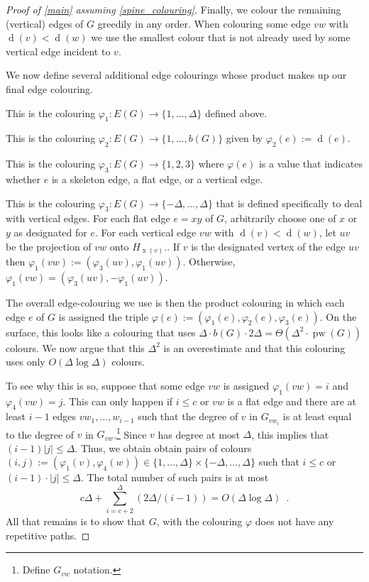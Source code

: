 \documentclass[kpfonts]{patmorin}
\DeclareMathOperator{\pw}{pw}
\DeclareMathOperator{\x}{x}
\DeclareMathOperator{\depth}{d}
\begin{document}
\begin{proof}[Proof of \cref{main} assuming \cref{spine_colouring}]
    Finally, we colour the remaining (vertical) edges of $G$ greedily in any order.  When colouring some edge $vw$ with $\depth(v)<\depth(w)$ we use the smallest colour that is not already used by some vertical edge incident to $v$.

    We now define several additional edge colourings whose product makes up our final edge colouring.
    \begin{compactenum}[$\varphi_1$:]
        \item This is the colouring $\varphi_1:E(G)\to\{1,\ldots,\Delta\}$ defined above.
        \item This is the colouring $\varphi_2:E(G)\to\{1,\ldots,b(G)\}$ given by $\varphi_2(e):=\depth(e)$.
        \item This is the colouring $\varphi_3:E(G)\to\{1,2,3\}$ where $\varphi(e)$ is a value that indicates whether $e$ is a skeleton edge, a flat edge, or a vertical edge.
        \item This is the colouring $\varphi_3:E(G)\to\{-\Delta,\ldots,\Delta\}$ that is defined specifically to deal with vertical edges.  For each flat edge $e=xy$ of $G$, arbitrarily choose one of $x$ or $y$ as designated for $e$.  For each vertical edge $vw$ with $\depth(v)<\depth(w)$, let $uv$ be the projection of $vw$ onto $H_{\x(v)}$..  If $v$ is the designated vertex of the edge $uv$ then $\varphi_1(vw):=(\varphi_3(uv),\varphi_1(uv))$. Otherwise, $\varphi_1(vw)=(\varphi_3(uv),-\varphi_1(uv))$.
    \end{compactenum}
    The overall edge-colouring we use is then the product colouring in which each edge $e$ of $G$ is assigned the triple $\varphi(e):=(\varphi_1(e),\varphi_2(e),\varphi_3(e))$.  On the surface, this looks like a colouring that uses $\Delta\cdot b(G)\cdot 2\Delta=\Theta(\Delta^2\cdot\pw(G))$ colours.  We now argue that this $\Delta^2$ is an overestimate and that this colouring uses only $O(\Delta\log\Delta)$ colours.

    To see why this is so, suppose that some edge $vw$ is assigned $\varphi_1(vw)=i$ and $\varphi_4(vw)=j$.  This can only happen if $i\le c$ or $vw$ is a flat edge and there are at least $i-1$ edges $vw_1,\ldots,w_{i-1}$ such that the degree of $v$ in $G_{vw_i}$ is at least equal to the degree of $v$ in $G_{vw}$.\footnote{Define $G_{vw}$ notation.}  Since $v$ has degree at most $\Delta$, this implies that $(i-1)|j|\le \Delta$.
    Thus, we obtain obtain pairs of colours $(i,j):=(\varphi_1(v),\varphi_4(w))\in\{1,\ldots,\Delta\}\times\{-\Delta,\ldots,\Delta\}$ such that $i\le c$ or $(i-1)\cdot |j|\le\Delta$.  The total number of such pairs is at most
    \[
        c\Delta + \sum_{i=c+2}^\Delta(2\Delta/(i-1)) = O(\Delta\log\Delta) \enspace .
    \]
    All that remains is to show that $G$, with the colouring $\varphi$ does not have any repetitive paths.


\end{proof}
\end{document}
